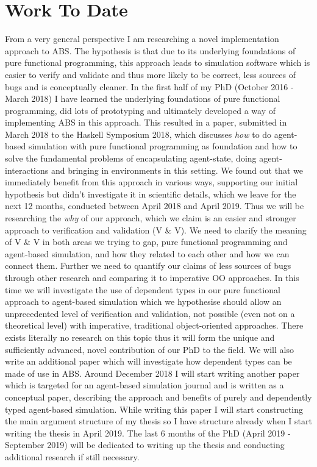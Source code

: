 \chapter{Work To Date}
\label{chap:work}

From a very general perspective I am researching a novel implementation approach to ABS. The hypothesis is that due to its underlying foundations of pure functional programming, this approach leads to simulation software which is easier to verify and validate and thus more likely to be correct, less sources of bugs and is conceptually cleaner.
In the first half of my PhD (October 2016 - March 2018) I have learned the underlying foundations of pure functional programming, did lots of prototyping and ultimately developed a way of implementing ABS in this approach. This resulted in a paper, submitted in March 2018 to the Haskell Symposium 2018, which discusses \textit{how} to do agent-based simulation with pure functional programming as foundation and how to solve the fundamental problems of encapsulating agent-state, doing agent-interactions and bringing in environments in this setting.
We found out that we immediately benefit from this approach in various ways, supporting our initial hypothesis but didn't investigate it in scientific details, which we leave for the next 12 months, conducted between April 2018 and April 2019. Thus we will be researching the \textit{why} of our approach, which we claim is an easier and stronger approach to verification and validation (V \& V). We need to clarify the meaning of V \& V in both areas we trying to gap, pure functional programming and agent-based simulation, and how they related to each other and how we can connect them. Further we need to quantify our claims of less sources of bugs through other research and comparing it to imperative OO approaches.
In this time we will investigate the use of dependent types in our pure functional approach to agent-based simulation which we hypothesise should allow an unprecedented level of verification and validation, not possible (even not on a theoretical level) with imperative, traditional object-oriented approaches. There exists literally no research on this topic thus it will form the unique and sufficiently advanced, novel contribution of our PhD to the field. We will also write an additional paper which will investigate how dependent types can be made of use in ABS.
Around December 2018 I will start writing another paper which is targeted for an agent-based simulation journal and is written as a conceptual paper, describing the approach and benefits of purely and dependently typed agent-based simulation. While writing this paper I will start constructing the main argument structure of my thesis so I have structure already when I start writing the thesis in April 2019. The last 6 months of the PhD (April 2019 - September 2019) will be dedicated to writing up the thesis and conducting additional research if still necessary.

